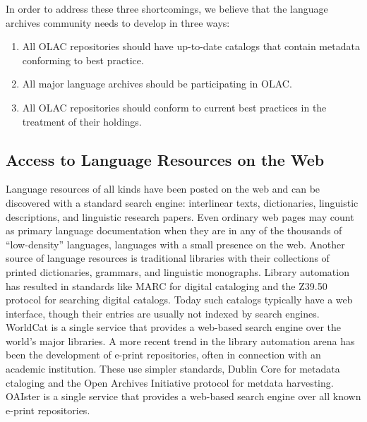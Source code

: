 
In order to address these three shortcomings, we believe that the
language archives community needs to develop in three ways:

\begin{enumerate}\setlength{\itemsep}{0pt}
\item All OLAC repositories should have up-to-date catalogs
      that contain metadata conforming to best practice.
\item All major language archives should be participating in OLAC.
\item All OLAC repositories should conform to current best practices
      in the treatment of their holdings.
\end{enumerate}

\subsection{Access to Language Resources on the Web}


Language resources of all kinds have been posted on the web and can be
discovered with a standard search engine: interlinear texts,
dictionaries, linguistic descriptions, and linguistic research papers.
Even ordinary web pages may count as primary language documentation
when they are in any of the thousands of ``low-density'' languages,
languages with a small presence on the web.  Another source of
language resources is traditional libraries with their collections of
printed dictionaries, grammars, and linguistic monographs.  Library
automation has resulted in standards like MARC for digital cataloging
and the Z39.50 protocol for searching digital catalogs. Today such
catalogs typically have a web interface, though their entries are
usually not indexed by search engines.  WorldCat is a single service
that provides a web-based search engine over the world's major
libraries. A more recent trend in the library automation arena has
been the development of e-print repositories, often in connection with
an academic institution.  These use simpler standards, Dublin Core for
metadata ctaloging and the Open Archives Initiative protocol for
metdata harvesting.  OAIster is a single service that provides a
web-based search engine over all known e-print repositories.



